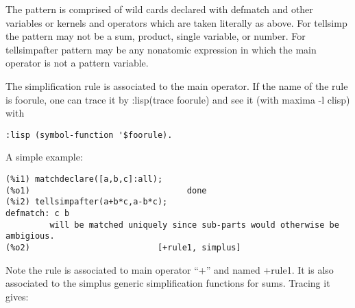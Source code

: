 \documentclass[a4paper,11pt]{article}
\begin{document}
The pattern is comprised of wild cards declared with defmatch and
other variables or kernels and operators which are taken literally as
above.  For tellsimp the pattern may not be a sum, product, single
variable, or number. For tellsimpafter pattern may be any nonatomic
expression in which the main operator is not a pattern variable.

The simplification rule is associated to the main operator. If the
name of the rule is foorule, one can trace it by :lisp(trace foorule)
and see it (with maxima -l clisp) with 
\begin{verbatim}
:lisp (symbol-function '$foorule). 
\end{verbatim}
A simple example:
\begin{verbatim}
(%i1) matchdeclare([a,b,c]:all);
(%o1)                                done
(%i2) tellsimpafter(a+b*c,a-b*c);
defmatch: c b
         will be matched uniquely since sub-parts would otherwise be ambigious.
(%o2)                          [+rule1, simplus]
\end{verbatim}
Note the rule is associated to main operator ``+'' and named +rule1.  It
is also associated to the simplus generic simplification functions for
sums. Tracing it gives:
\end{document}
